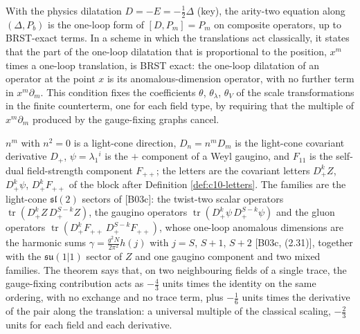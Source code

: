 \begin{remark}
With the physics dilatation $D=-E=-\tfrac12\Delta$ (key), the arity-two equation along $(\Delta,P_b)$ is the one-loop form of $[D,P_m]=P_m$ on composite operators, up to BRST-exact terms. In a scheme in which the translations act classically, it states that the part of the one-loop dilatation that is proportional to the position, $x^m$ times a one-loop translation, is BRST exact: the one-loop dilatation of an operator at the point $x$ is its anomalous-dimension operator, with no further term in $x^m\partial_m$. This condition fixes the coefficients $\theta$, $\theta_\lambda$, $\theta_V$ of the scale transformations in the finite counterterm, one for each field type, by requiring that the multiple of $x^m\partial_m$ produced by the gauge-fixing graphs cancel.
\end{remark}

\begin{remark}
$n^m$ with $n^2=0$ is a light-cone direction, $D_n=n^mD_m$ is the light-cone covariant derivative $D_+$, $\psi=\lambda_1{}^i$ is the $+$ component of a Weyl gaugino, and $F_{11}$ is the self-dual field-strength component $F_{++}$; the letters are the covariant letters $D_+^kZ$, $D_+^k\psi$, $D_+^kF_{++}$ of the block after Definition \ref{def:c10-letters}. The families are the light-cone $\mathfrak{sl}(2)$ sectors of [B03c]: the twist-two scalar operators $\operatorname{tr}(D_+^kZ\,D_+^{S-k}Z)$, the gaugino operators $\operatorname{tr}(D_+^k\psi\,D_+^{S-k}\psi)$ and the gluon operators $\operatorname{tr}(D_+^kF_{++}\,D_+^{S-k}F_{++})$, whose one-loop anomalous dimensions are the harmonic sums $\gamma=\frac{g^2N}{2\pi^2}h(j)$ with $j=S$, $S+1$, $S+2$ [B03c, (2.31)], together with the $\mathfrak{su}(1|1)$ sector of $Z$ and one gaugino component and two mixed families. The theorem says that, on two neighbouring fields of a single trace, the gauge-fixing contribution acts as $-\tfrac43$ units times the identity on the same ordering, with no exchange and no trace term, plus $-\tfrac16$ units times the derivative of the pair along the translation: a universal multiple of the classical scaling, $-\tfrac23$ units for each field and each derivative.
\end{remark}

